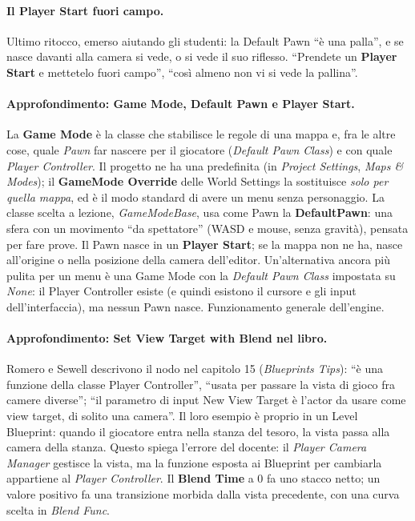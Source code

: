 \paragraph{Il Player Start fuori campo.} Ultimo ritocco, emerso aiutando gli studenti: la
Default Pawn ``è una palla'', e se nasce davanti alla camera si vede, o si vede il suo
riflesso. ``Prendete un \textbf{Player Start} e mettetelo fuori campo'', ``così almeno non vi
si vede la pallina''.

\paragraph{Approfondimento: Game Mode, Default Pawn e Player Start.} La \textbf{Game Mode}
è la classe che stabilisce le regole di una mappa e, fra le altre cose, quale
\emph{Pawn} far nascere per il giocatore (\emph{Default Pawn Class}) e con quale
\emph{Player Controller}. Il progetto ne ha una predefinita (in \emph{Project Settings},
\emph{Maps \& Modes}); il \textbf{GameMode Override} delle World Settings la sostituisce
\emph{solo per quella mappa}, ed è il modo standard di avere un menu senza personaggio.
La classe scelta a lezione, \emph{GameModeBase}, usa come Pawn la \textbf{DefaultPawn}:
una sfera con un movimento ``da spettatore'' (WASD e mouse, senza gravità), pensata per
fare prove. Il Pawn nasce in un \textbf{Player Start}; se la mappa non ne ha, nasce
all'origine o nella posizione della camera dell'editor. Un'alternativa ancora più pulita
per un menu è una Game Mode con la \emph{Default Pawn Class} impostata su \emph{None}: il
Player Controller esiste (e quindi esistono il cursore e gli input dell'interfaccia), ma
nessun Pawn nasce. Funzionamento generale dell'engine.

\paragraph{Approfondimento: Set View Target with Blend nel libro.} Romero e Sewell
descrivono il nodo nel capitolo 15 (\emph{Blueprints Tips}): ``è una funzione della classe
Player Controller'', ``usata per passare la vista di gioco fra camere diverse''; ``il
parametro di input New View Target è l'actor da usare come view target, di solito una
camera''. Il loro esempio è proprio in un Level Blueprint: quando il giocatore entra nella
stanza del tesoro, la vista passa alla camera della stanza. Questo spiega l'errore del
docente: il \emph{Player Camera Manager} gestisce la vista, ma la funzione esposta ai
Blueprint per cambiarla appartiene al \emph{Player Controller}. Il \textbf{Blend Time} a 0
fa uno stacco netto; un valore positivo fa una transizione morbida dalla vista precedente,
con una curva scelta in \emph{Blend Func}.

